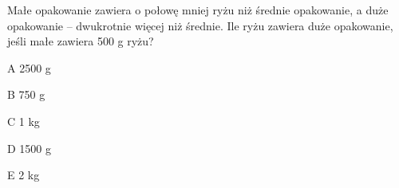 \begin{tresc}
Małe opakowanie zawiera o połowę mniej ryżu niż średnie opakowanie, a duże opakowanie – dwukrotnie więcej niż średnie. Ile ryżu zawiera duże opakowanie, jeśli małe zawiera 500 g ryżu?
\end{tresc}
\begin{wariant}{A} 2500 g \end{wariant}
\begin{wariant}{B} 750 g \end{wariant}
\begin{wariant}{C} 1 kg \end{wariant}
\begin{wariant}{D} 1500 g \end{wariant}
\begin{wariant}{E} 2 kg \end{wariant}

